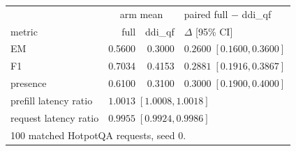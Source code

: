 \begin{tabular}{lrrl}
\toprule
 & \multicolumn{2}{c}{arm mean} & paired full $-$ ddi\_qf \\
metric & full & ddi\_qf & $\Delta$ [95\% CI] \\
\midrule
EM & 0.5600 & 0.3000 & $0.2600\;[0.1600, 0.3600]$ \\
F1 & 0.7034 & 0.4153 & $0.2881\;[0.1916, 0.3867]$ \\
presence & 0.6100 & 0.3100 & $0.3000\;[0.1900, 0.4000]$ \\
\midrule
prefill latency ratio & \multicolumn{3}{l}{$1.0013\;[1.0008, 1.0018]$} \\
request latency ratio & \multicolumn{3}{l}{$0.9955\;[0.9924, 0.9986]$} \\
\midrule
\multicolumn{4}{l}{100 matched HotpotQA requests, seed 0.} \\
\bottomrule
\end{tabular}

